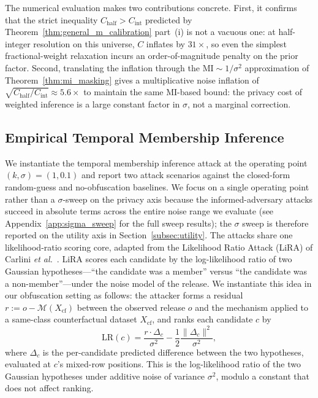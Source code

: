 \documentclass[sigconf,anonymous, review]{acmart}
\begin{document}
The numerical evaluation makes two contributions concrete. First, it confirms that the strict inequality $C_{\mathrm{half}} > C_{\mathrm{int}}$ predicted by Theorem~\ref{thm:general_m_calibration} part~(i) is not a vacuous one: at half-integer resolution on this universe, $C$ inflates by $31\times$, so even the simplest fractional-weight relaxation incurs an order-of-magnitude penalty on the prior factor. Second, translating the inflation through the $\mathrm{MI} \sim 1/\sigma^2$ approximation of Theorem~\ref{thm:mi_masking} gives a multiplicative noise inflation of $\sqrt{C_{\mathrm{half}}/C_{\mathrm{int}}} \approx 5.6\times$ to maintain the same MI-based bound: the privacy cost of weighted inference is a large constant factor in $\sigma$, not a marginal correction.

\subsection{Empirical Temporal Membership Inference}
\label{subsec:mia_operating_point}

We instantiate the temporal membership inference attack at the operating point $(k, \sigma) = (1, 0.1)$ and report two attack scenarios against the closed-form random-guess and no-obfuscation baselines. We focus on a single operating point rather than a $\sigma$-sweep on the privacy axis because the informed-adversary attacks succeed in absolute terms across the entire noise range we evaluate (see Appendix~\ref{app:sigma_sweep} for the full sweep results); the $\sigma$ sweep is therefore reported on the utility axis in Section~\ref{subsec:utility}. The attacks share one likelihood-ratio scoring core, adapted from the Likelihood Ratio Attack (LiRA) of Carlini \textit{et al.}~\cite{carlini2022firstprinciples}. LiRA scores each candidate by the log-likelihood ratio of two Gaussian hypotheses---``the candidate was a member'' versus ``the candidate was a non-member''---under the noise model of the release. We instantiate this idea in our obfuscation setting as follows: the attacker forms a residual $r := o - \mathcal{M}(X_{\mathrm{cf}})$ between the observed release $o$ and the mechanism applied to a same-class counterfactual dataset $X_{\mathrm{cf}}$, and ranks each candidate $c$ by
\[
\mathrm{LR}(c) = \frac{r \cdot \Delta_c}{\sigma^2} - \frac{1}{2} \frac{\|\Delta_c\|^2}{\sigma^2},
\]
where $\Delta_c$ is the per-candidate predicted difference between the two hypotheses, evaluated at $c$'s mixed-row positions. This is the log-likelihood ratio of the two Gaussian hypotheses under additive noise of variance $\sigma^2$, modulo a constant that does not affect ranking.
\end{document}
